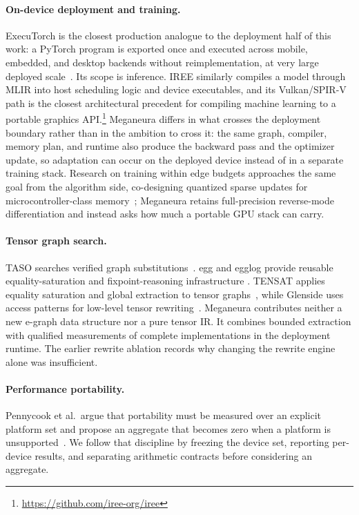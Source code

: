 \documentclass[10pt,twocolumn]{article}
\newcommand{\system}{Meganeura}
\begin{document}
\paragraph{On-device deployment and training.}
ExecuTorch is the closest production analogue to the deployment half of this
work: a PyTorch program is exported once and executed across mobile,
embedded, and desktop backends without reimplementation, at very large
deployed scale~\cite{nachin2026executorch}. Its scope is inference. IREE
similarly compiles a model through MLIR into host scheduling logic and
device executables, and its Vulkan/SPIR-V path is the closest architectural
precedent for compiling machine learning to a portable graphics
API.\footnote{\url{https://github.com/iree-org/iree}} \system{} differs in
what crosses the deployment boundary rather than in the ambition to cross
it: the same graph, compiler, memory plan, and runtime also produce the
backward pass and the optimizer update, so adaptation can occur on the
deployed device instead of in a separate training stack. Research on
training within edge budgets approaches the same goal from the algorithm
side, co-designing quantized sparse updates for microcontroller-class
memory~\cite{lin2022ondevice}; \system{} retains full-precision reverse-mode
differentiation and instead asks how much a portable GPU stack can carry.

\paragraph{Tensor graph search.}
TASO searches verified graph substitutions~\cite{jia2019taso}. egg and egglog
provide reusable equality-saturation and fixpoint-reasoning infrastructure
\cite{willsey2021egg,zhang2023egglog}. TENSAT applies equality saturation and
global extraction to tensor graphs~\cite{yang2021tensat}, while Glenside uses
access patterns for low-level tensor rewriting~\cite{smith2021glenside}.
\system{} contributes neither a new e-graph data structure nor a pure tensor IR.
It combines bounded extraction with qualified measurements of complete
implementations in the deployment runtime. The earlier rewrite ablation
records why changing the rewrite engine alone was insufficient.

\paragraph{Performance portability.}
Pennycook et al.\ argue that portability must be measured over an explicit
platform set and propose an aggregate that becomes zero when a platform is
unsupported~\cite{pennycook2016metric}. We follow that discipline by freezing
the device set, reporting per-device results, and separating arithmetic
contracts before considering an aggregate.
\end{document}
